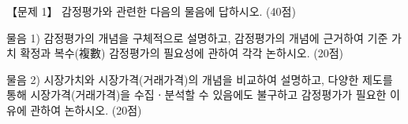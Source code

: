 \begin{longquestion}{【문제 1】}
감정평가와 관련한 다음의 물음에 답하시오. (40점) \par
\medskip\noindent 물음 1) 감정평가의 개념을 구체적으로 설명하고, 감정평가의 개념에 근거하여 기준 가치 확정과 복수(複數) 감정평가의 필요성에 관하여 각각 논하시오. (20점) \par
\medskip\noindent 물음 2) 시장가치와 시장가격(거래가격)의 개념을 비교하여 설명하고, 다양한 제도를 통해 시장가격(거래가격)을 수집ㆍ분석할 수 있음에도 불구하고 감정평가가 필요한 이유에 관하여 논하시오. (20점) \par
\end{longquestion}
